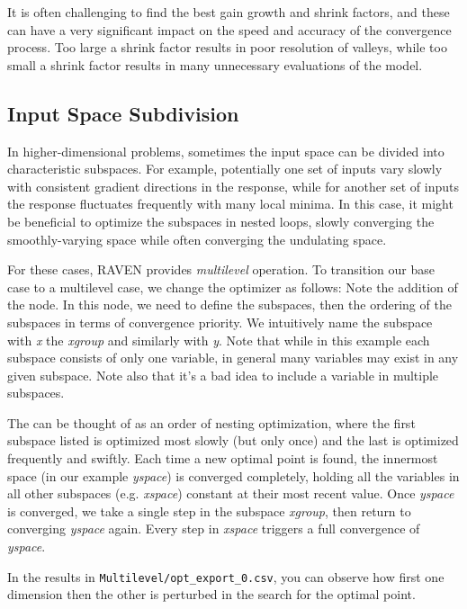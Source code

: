 It is often challenging to find the best gain growth and shrink factors, and these can have a very significant
impact on the speed and accuracy of the convergence process.  Too large a shrink factor results in poor
resolution of valleys, while too small a shrink factor results in many unnecessary evaluations of the model.

\subsection{Input Space Subdivision}
In higher-dimensional problems, sometimes the input space can be divided into characteristic subspaces.  For
example, potentially one set of inputs vary slowly with consistent gradient directions in the response, while
for another set of inputs the response fluctuates frequently with many local minima.  In this case, it might
be beneficial to optimize the subspaces in nested loops, slowly converging the smoothly-varying space while
often converging the undulating space.

For these cases, RAVEN provides \emph{multilevel} operation.  To transition our base case to a multilevel
case, we change the optimizer as follows:
Note the addition of the  node.  In this node, we need to define the subspaces, then the
ordering of the subspaces in terms of convergence priority.  We intuitively name the subspace with \emph{x}
the \emph{xgroup} and similarly with \emph{y}.  Note that while in this example each subspace consists of only
one variable, in general many variables may exist in any given subspace.  Note also that it's a bad idea to
include a variable in multiple subspaces.

The  can be thought of as an order of nesting optimization, where the first subspace listed
is optimized most slowly (but only once) and the last is optimized frequently and swiftly.  Each time a new
optimal point is found, the innermost space (in our example \emph{yspace}) is converged completely, holding all
the variables in all other subspaces (e.g. \emph{xspace}) constant at their most recent value.  Once
\emph{yspace} is converged, we take a single step in the subspace \emph{xgroup}, then return to converging
\emph{yspace} again.  Every step in \emph{xspace} triggers a full convergence of \emph{yspace}.

In the results in \texttt{Multilevel/opt\_export\_0.csv}, you can observe how first one dimension then the
other is perturbed in the search for the optimal point.

